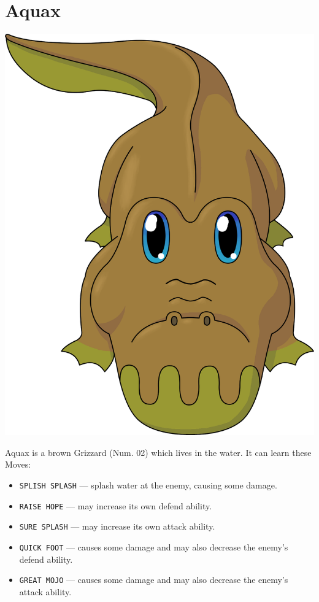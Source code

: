 \documentclass[10pt,twocolumn,openany,article]{memoir}
\begin{document}
\section{Aquax}

\includegraphics[width=\columnwidth]{../Manual/Aquax.png}

Aquax is  a brown Grizzard  (Num. 02) which lives  in the water.  It can
learn these Moves:

\begin{itemize}
\item  \texttt{SPLISH SPLASH}  --- splash  water at  the enemy,  causing
  some damage. 
\item \texttt{RAISE HOPE} --- may increase its own defend ability.
\item \texttt{SURE SPLASH} --- may increase its own attack ability.
\item \texttt{QUICK FOOT}  --- causes some damage and  may also decrease
  the enemy's defend ability.
\item \texttt{GREAT MOJO}  --- causes some damage and  may also decrease
  the enemy's attack ability.
\end{itemize}
\end{document}
